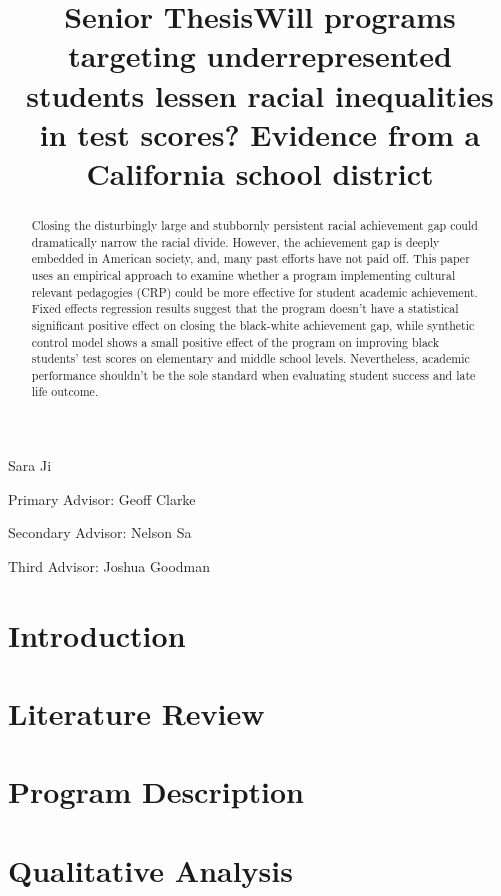 \documentclass{cup-ino}
\title{Senior Thesis}
\title{Will programs targeting underrepresented students lessen racial inequalities in test scores? Evidence from a California school district}
\theoremstyle{definition}
\numberwithin{equation}{subsection}
\begin{document}
\maketitle
\begin{center}
Sara Ji

Primary Advisor: Geoff Clarke

Secondary Advisor: Nelson Sa

Third Advisor: Joshua Goodman

\end{center}

\begin{flushleft}
\begin{abstract}
Closing the disturbingly large and stubbornly persistent racial achievement gap could dramatically narrow the racial divide. However, the achievement gap is deeply embedded in American society, and, many past efforts have not paid off. This paper uses an empirical approach to examine whether a program implementing cultural relevant pedagogies (CRP) could be more effective for student academic achievement. Fixed effects regression results suggest that the program doesn't have a statistical significant positive effect on closing the black-white achievement gap, while synthetic control model shows a small positive effect of the program on improving black students' test scores on elementary and middle school levels. Nevertheless, academic performance shouldn't be the sole standard when evaluating student success and late life outcome. 
\end{abstract}

\newpage
\onehalfspacing
\section{Introduction}


\section{Literature Review}


\section{Program Description}


\section{Qualitative Analysis}



\end{flushleft}
\end{document}
